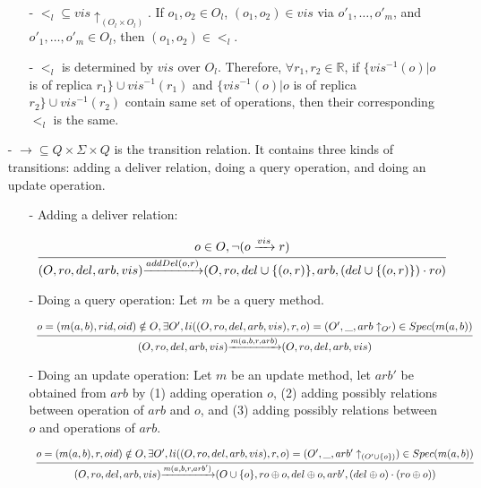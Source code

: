 \begin{itemize}
    \begin{itemize}
    \setlength{\itemsep}{0.5pt}
    \item[-] $<_l \subseteq vis \uparrow_{(O_l \times O_l)}$. If $o_1,o_2 \in O_l$, $(o_1,o_2) \in vis$ via $o'_1,\ldots,o'_m$, and $o'_1,\ldots,o'_m \in O_l$, then $(o_1,o_2) \in <_l$.

    \item[-] $<_l$ is determined by $vis$ over $O_l$. Therefore, $\forall r_1,r_2 \in \mathbb{R}$, if $\{ vis^{-1}(o) \vert o$ is of replica $r_1 \} \cup vis^{-1}(r_1)$ and $\{ vis^{-1}(o) \vert o$ is of replica $r_2 \} \cup vis^{-1}(r_2)$ contain same set of operations, then their corresponding $<_l$ is the same.
    \end{itemize}

\item[-] $\rightarrow \subseteq Q \times \Sigma \times Q$ is the transition relation. It contains three kinds of transitions: adding a deliver relation, doing a query operation, and doing an update operation.

    \begin {itemize}
    \item[-] Adding a deliver relation:

     $\begin{array}{l c} \bigfrac{o \in O, \neg(o \xrightarrow{vis} r)} {(O,ro,del,arb,vis) {\xrightarrow{addDel(o,r)}} (O,ro,del \cup \{ (o,r) \},arb,(del \cup \{ (o,r) \}) \cdot ro)} \end{array}$

    \item[-] Doing a query operation: Let $m$ be a query method.

     $\begin{array}{l c} \bigfrac{ o=(m(a,b),rid,oid) \notin O, \exists O', li((O,ro,del,arb,vis),r,o) = (O',\_,arb \uparrow_{O'}) \in Spec(m(a,b))} {(O,ro,del,arb,vis) {\xrightarrow{m(a,b,r,arb)}} (O,ro,del,arb,vis)}  \end{array}$

     \item[-] Doing an update operation: Let $m$ be an update method, {\color {red}let $arb'$ be obtained from $arb$ by (1) adding operation $o$, (2) adding possibly relations between operation of $arb$ and $o$, and (3) adding possibly relations between $o$ and operations of $arb$.}

     $\begin{array}{l c} \bigfrac{o = (m(a,b),r,oid) \notin O, \exists O', li((O,ro,del,arb,vis),r,o) = (O',\_,arb' \uparrow_{(O' \cup \{ o \})}) \in Spec(m(a,b))} {(O,ro,del,arb,vis) {\xrightarrow{m(a,b,r,arb')}} (O \cup \{ o \},ro \oplus o ,del \oplus o,arb',(del \oplus o) \cdot (ro \oplus o))}  \end{array}$


\end{itemize}
\end{itemize}
